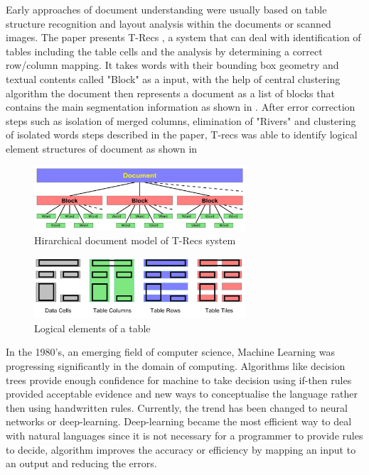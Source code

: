 Early approaches of document understanding were usually based on table structure recognition and layout analysis within the documents or scanned images. The paper presents T-Recs \cite{kieninger1998paper}, a system that can deal with identification of tables including the table cells and the analysis by determining a correct row/column mapping. It takes words with their bounding box geometry and textual contents called "Block" as a input, with the help of central clustering algorithm the document then represents a document as a list of blocks that contains the main segmentation information as shown in . After error correction steps such as isolation of merged columns, elimination of "Rivers" and clustering of isolated words steps described in the paper, T-recs was able to identify logical element structures of document as shown in 
\begin{figure}[hb]
    \centering
    \includegraphics[width=0.7\textwidth]{chapters/images/Literature_review/T_Recs_Blocks.JPG}
    \caption{Hirarchical document model of T-Recs system \cite{kieninger1998paper}}
    \label{fig:Hirarchical_document_model_of_T-Recs_system}
\end{figure}
\begin{figure}[hb]
    \centering
    \includegraphics[width=0.7\textwidth]{chapters/images/Literature_review/T_RecsJPG.JPG }
    \caption{Logical elements of a table \cite{kieninger1998paper}}
    \label{fig:T_recs}
\end{figure}

In the 1980's, an emerging field of computer science, Machine Learning was progressing significantly in the domain of computing. Algorithms like decision trees provide enough confidence for machine to take decision using if-then rules provided acceptable evidence and new ways to conceptualise the language rather then using handwritten rules. Currently, the trend has been changed to neural networks or deep-learning. Deep-learning became the most efficient way to deal with natural languages since it is not necessary for a programmer to provide rules to decide, algorithm improves the accuracy or efficiency by mapping an input to an output and reducing the errors. 

